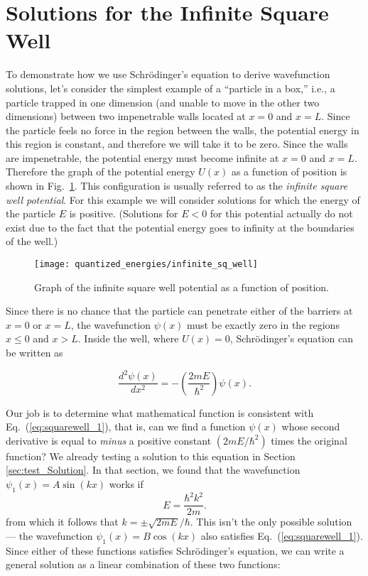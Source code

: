 \section{Solutions for the Infinite Square Well}
\label{sec:infinite_sq_well}

To demonstrate how we use Schr\"odinger's equation to derive
wavefunction solutions, let's consider the simplest example of a
``particle in a box,'' i.e., a
particle trapped in one dimension (and unable to move in the other
two dimensions) between two impenetrable walls
located at $x = 0$ and $x = L$.  Since the particle feels no force in
the region between the walls, the potential energy in this region is
constant, and therefore we will take it to be zero.  Since the walls
are impenetrable, the potential energy must become infinite at $x = 0$
and $x = L$.  Therefore the graph of the potential energy $U(x)$ as a
function of position is shown in Fig.~\ref{fig:infinite_sq_well}.
This configuration is usually referred to as the {\it infinite square
  well potential}.  For this example we will consider solutions for
which the energy of the particle $E$ is positive. (Solutions for $E <
0$ for this potential actually do not exist due to the fact that the
potential energy goes to infinity at the boundaries of the well.)

\begin{figure}[!tb]
\begin{center}
\texttt{[image: quantized\_energies/infinite\_sq\_well]}
\end{center}
\caption{Graph of the infinite square well potential as a function of
  position.}
\label{fig:infinite_sq_well}
\end{figure}


Since there is no chance that the particle can penetrate either of the
barriers at $x = 0$ or $x = L$, the wavefunction $\psi(x)$ must be
exactly zero in the regions $x \le 0$ and $x > L$.  Inside the well,
where $U(x) = 0$, Schr\"odinger's equation can be written as

\begin{equation}
\frac{d^2\psi(x)}{dx^2}  = - \left(\frac{2mE}{\hbar^2}\right)\psi(x).
\label{eq:squarewell_1}
\end{equation}

Our job is to determine what mathematical function is consistent with
Eq.~(\ref{eq:squarewell_1}), that is, can we find a function
$\psi(x)$ whose second derivative is equal to {\it minus} a positive
constant $(2 m E/ \hbar^2)$ times the original function?  
We already testing a solution to this equation in Section 
\ref{sec:test_Solution}.
In that section, we found that the wavefunction 
$\psi_1(x) = A\sin(kx)$
works if 
\begin{equation}
\label{eq:squarewell_2}
E = \frac{\hbar^2 k^2}{2m}.
\end{equation}
from which it follows that $k = \pm\sqrt{2mE}/\hbar$. 
This isn't the only possible solution --- the wavefunction 
$\psi_1(x) = B\cos(kx)$ also satisfies Eq.~(\ref{eq:squarewell_1}).
Since either of these functions satisfies Schr\"odinger's equation, we
can write a general solution as a linear combination of these two
functions:

